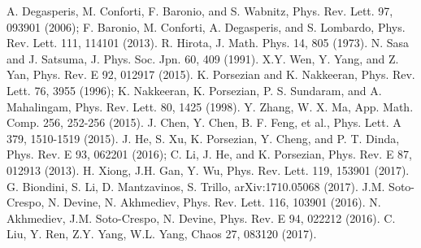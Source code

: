 \documentclass[aps,twocolumn,showpacs]{revtex4}
\begin{document}
\begin{thebibliography}{99}
 A. Degasperis, M. Conforti, F. Baronio, and S. Wabnitz,
Phys. Rev. Lett. 97, 093901 (2006); F. Baronio, M. Conforti, A. Degasperis, and S. Lombardo, Phys. Rev. Lett. 111, 114101 (2013).
 R. Hirota, J. Math. Phys. 14, 805 (1973).
 N. Sasa and J. Satsuma, J. Phys. Soc. Jpn. 60, 409 (1991).
 X.Y. Wen, Y. Yang, and Z. Yan, Phys. Rev. E 92, 012917 (2015).
 K. Porsezian and K. Nakkeeran, Phys. Rev. Lett. 76, 3955
(1996); K. Nakkeeran, K. Porsezian, P. S. Sundaram, and
A. Mahalingam, Phys. Rev. Lett. 80, 1425 (1998).
 Y. Zhang, W. X. Ma, App. Math. Comp. 256, 252-256 (2015).
 J. Chen, Y. Chen, B. F. Feng, et al., Phys. Lett. A 379, 1510-1519 (2015).
 J. He, S. Xu, K. Porsezian, Y. Cheng, and P. T. Dinda, Phys. Rev. E 93, 062201 (2016); C. Li, J. He, and K. Porsezian, Phys. Rev. E 87, 012913  (2013).
 H. Xiong, J.H. Gan, Y. Wu, Phys. Rev. Lett. 119, 153901 (2017).
 G. Biondini,  S. Li,  D. Mantzavinos, S. Trillo, arXiv:1710.05068 (2017).
 J.M. Soto-Crespo, N. Devine, N. Akhmediev, Phys. Rev. Lett. 116, 103901 (2016).
 N. Akhmediev, J.M. Soto-Crespo, N. Devine, Phys. Rev. E 94, 022212 (2016).
  C. Liu, Y. Ren, Z.Y. Yang, W.L. Yang,   Chaos 27, 083120 (2017).
\end{thebibliography}
\end{document}
